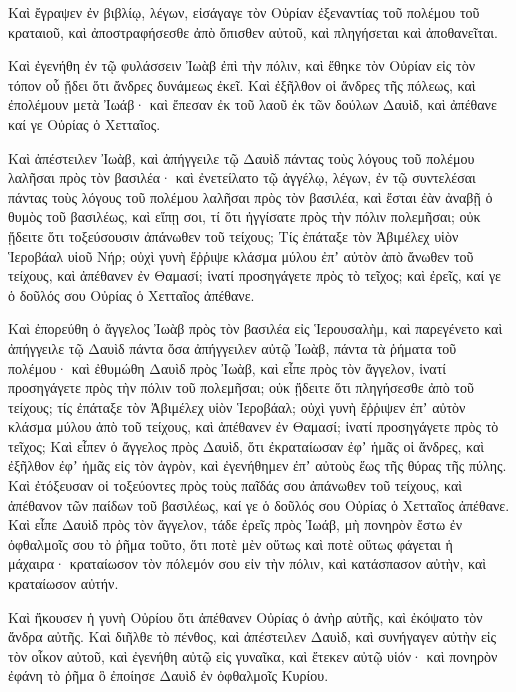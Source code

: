{Καὶ ἔγραψεν ἐν βιβλίῳ, λέγων, εἰσάγαγε τὸν Οὐρίαν ἐξεναντίας τοῦ πολέμου τοῦ κραταιοῦ, καὶ ἀποστραφήσεσθε ἀπὸ ὄπισθεν αὐτοῦ, καὶ πληγήσεται καὶ ἀποθανεῖται.
\par }{\PP {}Καὶ ἐγενήθη ἐν τῷ φυλάσσειν Ἰωὰβ ἐπὶ τὴν πόλιν, καὶ ἔθηκε τὸν Οὐρίαν εἰς τὸν τόπον οὗ ᾔδει ὅτι ἄνδρες δυνάμεως ἐκεῖ.
Καὶ ἐξῆλθον οἱ ἄνδρες τῆς πόλεως, καὶ ἐπολέμουν μετὰ Ἰωάβ· καὶ ἔπεσαν ἐκ τοῦ λαοῦ ἐκ τῶν δούλων Δαυὶδ, καὶ ἀπέθανε καί γε Οὐρίας ὁ Χετταῖος.
\par }{\PP {}Καὶ ἀπέστειλεν Ἰωὰβ, καὶ ἀπήγγειλε τῷ Δαυὶδ πάντας τοὺς λόγους τοῦ πολέμου λαλῆσαι πρὸς τὸν βασιλέα·
καὶ ἐνετείλατο τῷ ἀγγέλῳ, λέγων, ἐν τῷ συντελέσαι πάντας τοὺς λόγους τοῦ πολέμου λαλῆσαι πρὸς τὸν βασιλέα,
καὶ ἔσται ἐὰν ἀναβῇ ὁ θυμὸς τοῦ βασιλέως, καὶ εἴπῃ σοι, τί ὅτι ἠγγίσατε πρὸς τὴν πόλιν πολεμῆσαι; οὐκ ᾔδειτε ὅτι τοξεύσουσιν ἀπάνωθεν τοῦ τείχους;
Τίς ἐπάταξε τὸν Ἀβιμέλεχ υἱὸν Ἱεροβάαλ υἱοῦ Νήρ; οὐχὶ γυνὴ ἔῤῥιψε κλάσμα μύλου ἐπʼ αὐτὸν ἀπὸ ἄνωθεν τοῦ τείχους, καὶ ἀπέθανεν ἐν Θαμασί; ἱνατί προσηγάγετε πρὸς τὸ τεῖχος; καὶ ἐρεῖς, καί γε ὁ δοῦλός σου Οὐρίας ὁ Χετταῖος ἀπέθανε.
\par }{\PP {}Καὶ ἐπορεύθη ὁ ἄγγελος Ἰωὰβ πρὸς τὸν βασιλέα εἰς Ἱερουσαλὴμ, καὶ παρεγένετο καὶ ἀπήγγειλε τῷ Δαυὶδ πάντα ὅσα ἀπήγγειλεν αὐτῷ Ἰωὰβ, πάντα τὰ ῥήματα τοῦ πολέμου· καὶ ἐθυμώθη Δαυὶδ πρὸς Ἰωὰβ, καὶ εἶπε πρὸς τὸν ἄγγελον, ἱνατί προσηγάγετε πρὸς τὴν πόλιν τοῦ πολεμῆσαι; οὐκ ᾔδειτε ὅτι πληγήσεσθε ἀπὸ τοῦ τείχους; τίς ἐπάταξε τὸν Ἀβιμέλεχ υἱὸν Ἱεροβάαλ; οὐχὶ γυνὴ ἔῤῥιψεν ἐπʼ αὐτὸν κλάσμα μύλου ἀπὸ τοῦ τείχους, καὶ ἀπέθανεν ἐν Θαμασί; ἱνατί προσηγάγετε πρὸς τὸ τεῖχος;
Καὶ εἶπεν ὁ ἄγγελος πρὸς Δαυὶδ, ὅτι ἐκραταίωσαν ἐφʼ ἡμᾶς οἱ ἄνδρες, καὶ ἐξῆλθον ἐφʼ ἡμᾶς εἰς τὸν ἀγρὸν, καὶ ἐγενήθημεν ἐπʼ αὐτοὺς ἕως τῆς θύρας τῆς πύλης.
Καὶ ἐτόξευσαν οἱ τοξεύοντες πρὸς τοὺς παῖδάς σου ἀπάνωθεν τοῦ τείχους, καὶ ἀπέθανον τῶν παίδων τοῦ βασιλέως, καί γε ὁ δοῦλός σου Οὐρίας ὁ Χετταῖος ἀπέθανε.
Καὶ εἶπε Δαυὶδ πρὸς τὸν ἄγγελον, τάδε ἐρεῖς πρὸς Ἰωάβ, μὴ πονηρὸν ἔστω ἐν ὀφθαλμοῖς σου τὸ ῥῆμα τοῦτο, ὅτι ποτὲ μὲν οὕτως καὶ ποτὲ οὕτως φάγεται ἡ μάχαιρα· κραταίωσον τὸν πόλεμόν σου εἰν τὴν πόλιν, καὶ κατάσπασον αὐτὴν, καὶ κραταίωσον αὐτήν.
\par }{\PP {}Καὶ ἤκουσεν ἡ γυνὴ Οὐρίου ὅτι ἀπέθανεν Οὐρίας ὁ ἀνὴρ αὐτῆς, καὶ ἐκόψατο τὸν ἄνδρα αὐτῆς.
Καὶ διῆλθε τὸ πένθος, καὶ ἀπέστειλεν Δαυὶδ, καὶ συνήγαγεν αὐτὴν εἰς τὸν οἶκον αὐτοῦ, καὶ ἐγενήθη αὐτῷ εἰς γυναῖκα, καὶ ἔτεκεν αὐτῷ υἱόν· καὶ πονηρὸν ἐφάνη τὸ ῥῆμα ὃ ἐποίησε Δαυὶδ ἐν ὀφθαλμοῖς Κυρίου.

}
